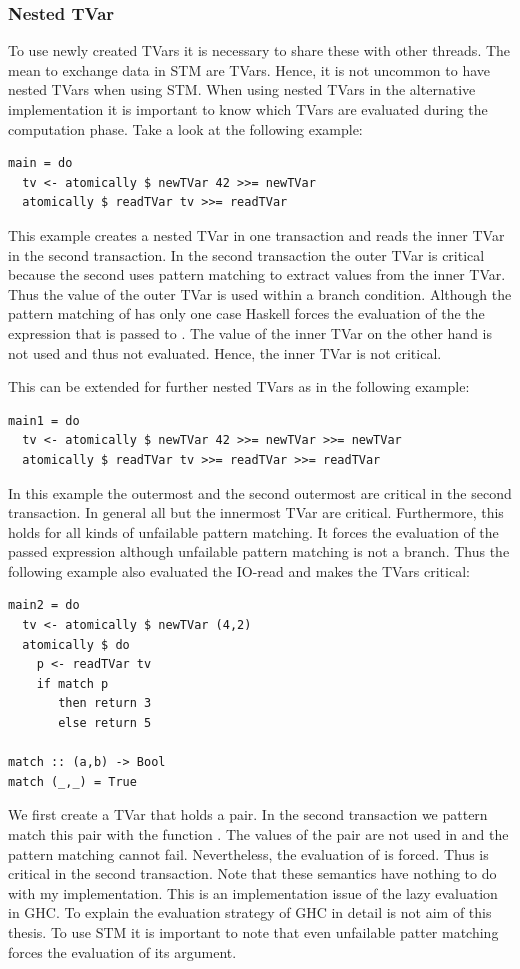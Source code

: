 \subsubsection{Nested TVar}
To use newly created TVars it is necessary to share these with other threads. The mean to exchange data in STM 
are TVars. Hence, it is not uncommon to have nested TVars when using STM. When using nested TVars in the alternative
implementation it is important to know which TVars are evaluated during the computation phase. Take a look at the 
following example:
\begin{lstlisting}
main = do
  tv <- atomically $ newTVar 42 >>= newTVar 
  atomically $ readTVar tv >>= readTVar 
\end{lstlisting}
This example creates a nested TVar in one transaction and reads the inner TVar in the second transaction. In the second
transaction the outer TVar is critical because the second  uses pattern matching to extract values from 
the inner TVar. Thus the value of the outer TVar is used within a branch condition. Although the pattern matching
of  has only one case Haskell forces the evaluation of the the expression that is passed to .
The value of the inner TVar on the other hand is not used and thus not evaluated. Hence, the inner TVar is not critical.

This can be extended for further nested TVars as in the following example:
\begin{lstlisting}
main1 = do
  tv <- atomically $ newTVar 42 >>= newTVar >>= newTVar 
  atomically $ readTVar tv >>= readTVar >>= readTVar 
\end{lstlisting}
In this example the outermost and the second outermost are critical in the second transaction. In general all but the 
innermost TVar are critical. Furthermore, this holds for all kinds of unfailable pattern matching. It forces the 
evaluation of the passed expression although unfailable pattern matching is not a branch. Thus the following example
also evaluated the IO-read and makes the TVars critical:
\begin{lstlisting}
main2 = do
  tv <- atomically $ newTVar (4,2)
  atomically $ do
    p <- readTVar tv
    if match p
       then return 3
       else return 5
 
match :: (a,b) -> Bool
match (_,_) = True
\end{lstlisting}
We first create a TVar that holds a pair. In the second transaction we pattern match this pair with the function .
The values of the pair are not used in  and the pattern matching cannot fail. Nevertheless, the evaluation of 
is forced. Thus  is critical in the second transaction. Note that these semantics have nothing to do with my implementation.
This is an implementation issue of the lazy evaluation in GHC. To explain the evaluation strategy of GHC in detail is not aim
of this thesis. To use STM it is important to note that even unfailable patter matching forces the evaluation of its argument.



